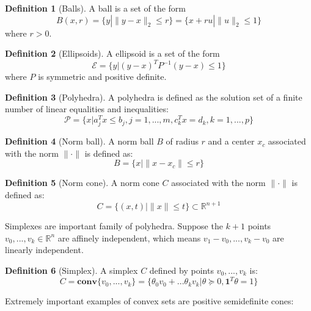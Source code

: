 \documentclass[
]{book}
\theoremstyle{definition}
\newtheorem{definition}{Definition}[chapter]
\theoremstyle{definition}
\theoremstyle{definition}
\theoremstyle{definition}
\theoremstyle{remark}
\begin{document}
\begin{definition}[Balls]
\protect\hypertarget{def:balls}{}\label{def:balls}A ball is a set of the form \[B(x,r) = \{y|\|y-x\|_2 \leq r\} = \{x+ru|\|u\|_2\leq 1\}\]
where \(r >0\).
\end{definition}

\begin{definition}[Ellipsoids]
\protect\hypertarget{def:ellipsoids}{}\label{def:ellipsoids}A ellipsoid is a set of the form \[\mathcal{E} = \{y|(y-x)^TP^{-1}(y-x)\leq 1\}\]
where \(P\) is symmetric and positive definite.
\end{definition}

\begin{definition}[Polyhedra]
\protect\hypertarget{def:polyhedra}{}\label{def:polyhedra}A polyhedra is defined as the solution set of a finite number of linear equalities
and inequalities: \[\mathcal{P} = \{x|a_j^Tx\leq b_j, j=1,...,m, c_k^Tx=d_k,k=1,...,p\}\]
\end{definition}

\begin{definition}[Norm ball]
\protect\hypertarget{def:normball}{}\label{def:normball}A norm ball \(B\) of radius \(r\) and a center \(x_c\) associated with the norm \(\|\cdot\|\) is defined as: \[B = \{x|\|x-x_c\|\leq r\}\]
\end{definition}

\begin{definition}[Norm cone]
\protect\hypertarget{def:normcone}{}\label{def:normcone}A norm cone \(C\) associated with the norm \(\|\cdot\|\) is defined as: \[C = \{(x,t)|\|x\|\leq t\}\subset \mathbb{R}^{n+1}\]
\end{definition}

Simplexes are important family of polyhedra. Suppose the \(k+1\) points \(v_0,...,v_k\in \mathbb{R}^n\) are affinely independent, which means \(v_1-v_0,...,v_k-v_0\) are linearly independent.

\begin{definition}[Simplex]
\protect\hypertarget{def:simplex}{}\label{def:simplex}A simplex \(C\) defined by points \(v_0,...,v_k\) is: \[C = \textbf{conv}\{v_0,...,v_k\} = \{\theta_0v_0 + ... \theta_kv_k|\theta \succeq 0, \textbf{1}^T\theta = 1\}\]
\end{definition}

Extremely important examples of convex sets are positive semidefinite cones:
\end{document}
